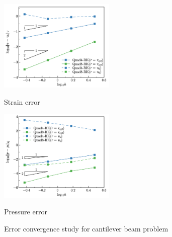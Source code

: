 \begin{figure}[H]
\centering
\begin{subcaptiongroup}
\centering
\parbox[b]{0.49\textwidth}{
    \includegraphics[width=0.49\textwidth]{png/cantilever_Hdev.png}
    \caption{Strain error}\label{fg:cantilever_convergence_strain}
}
\parbox[b]{0.49\textwidth}{
    \includegraphics[width=0.49\textwidth]{png/cantilever_L2_p.png}
    \caption{Pressure error}\label{fg:cantilever_convergence_pressure}
}
\end{subcaptiongroup}
\caption{Error convergence study for cantilever beam problem}\label{fg:cantilever_convergence}
\end{figure}

